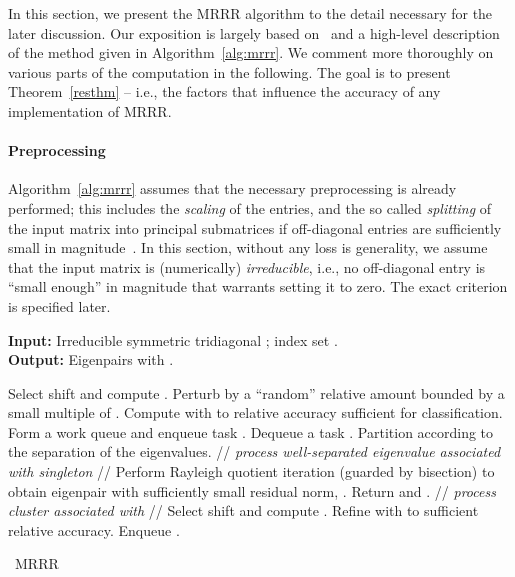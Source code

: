 \documentclass[final]{siamltex}
\begin{document}
In this section, we present the MRRR algorithm to the detail necessary for the
later discussion. 
Our exposition is largely based
on~\cite{Willems:framework,Willems:twisted,Dhillon:2004:MRRR} and a
high-level description of the method given in Algorithm~\ref{alg:mrrr}. We
comment more thoroughly on various parts of the computation in the following.  
The goal is to present
Theorem~\ref{resthm} -- i.e., the factors that influence the accuracy of any
implementation of MRRR.

\paragraph{Preprocessing} Algorithm~\ref{alg:mrrr} assumes that the necessary
preprocessing is already performed; this includes the {\it scaling} of the entries, and
the so called {\it splitting} of the input matrix into principal submatrices
if off-diagonal entries are sufficiently small in
magnitude~\cite{Parlett:1998:SEP}. 
In this section, without any loss is generality, we assume that
the input matrix is (numerically) {\it irreducible}, i.e., 
no off-diagonal entry is ``small enough'' in magnitude that warrants setting it
to zero. The exact criterion is specified later.
\begin{algorithm}[ht]
 \small
    {\bf Input:} Irreducible symmetric tridiagonal ; index set . \\
    {\bf Output:} Eigenpairs  with
    .
    
    \vspace{1mm}

  \begin{algorithmic}[1]
    \STATE Select shift  and compute . \label{line:mrrr:root} 
    \STATE Perturb  by a ``random'' relative amount bounded by a
    small multiple of . \label{line:mrrr:perturb}
    \STATE Compute  with 
    to relative accuracy sufficient for classification. 
    \label{line:mrrr:initialeigvals} 
    \STATE Form a work queue  and enqueue task
    . \label{line:mrrr:enddlarre}
    \STATE Dequeue a task . \label{line:mrrr:dequeue}
    \STATE Partition   according 
    to the separation of the eigenvalues. \label{line:mrrr:initialpartitioning}
    \IF{} \label{line:mrrr:ifstatement} 
    \STATE // {\it process well-separated eigenvalue associated with
      singleton } //
    \STATE Perform Rayleigh quotient iteration (guarded by bisection) to
    obtain eigenpair  with sufficiently
    small residual norm, . \label{line:mrrr:rqi}
    \STATE Return  and
     . \label{line:mrrr:returneigenpair} 
    \ELSE
    \STATE // {\it process cluster associated with } //
    \STATE Select shift  and compute . \label{line:mrrr:shifting}  
    \STATE Refine  with  to
    sufficient relative 
    accuracy. \label{line:mrrr:refine} 
    \STATE Enqueue . \label{line:mrrr:partition} 
    \ENDIF
    \ENDFOR
    \ENDWHILE \label{line:mrrr:end}
  \end{algorithmic}
  \caption{\ MRRR}
  \label{alg:mrrr}
\end{algorithm}
\end{document}
